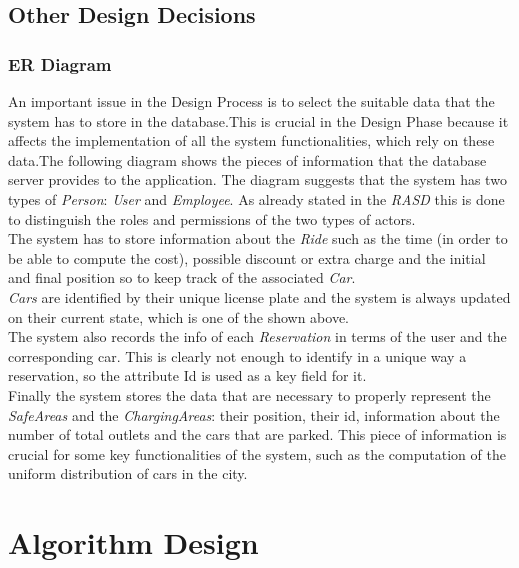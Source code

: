 \documentclass[11pt,a4paper]{report}
\begin{document}
\section{Other Design Decisions}
\subsection{ER Diagram}
An important issue in the Design Process is to select the suitable data that the system has to store in the database.This is crucial in the Design Phase because it affects the implementation of all the system functionalities, which rely on these data.The following diagram shows the pieces of information that the database server provides to the application.
\noindent The diagram suggests that the system has two types of \textit{Person}: \textit{User} and \textit{Employee}. As already stated in the \textit{RASD} this is done to distinguish the roles and permissions of the two types of actors.\\
The system has to store information about the \textit{Ride} such as the time (in order to be able to compute the cost), possible discount or extra charge and the initial and final position so to keep track of the associated \textit{Car}.\\\textit{Cars} are identified by their unique license plate and the system is always updated on their current state, which is one of the shown above.\\The system also records the info of each \textit{Reservation} in terms of the user and the corresponding car. This is clearly not enough to identify in a unique way a reservation, so the attribute Id is used as a key field for it.\\
Finally the system stores the data that are necessary to properly represent the \textit{SafeAreas} and the \textit{ChargingAreas}: their position, their id, information about the number of total outlets and the cars that are parked. This piece of information is crucial for some key functionalities of the system, such as the computation of the uniform distribution of cars in the city.

\chapter{Algorithm Design}
\end{document}
